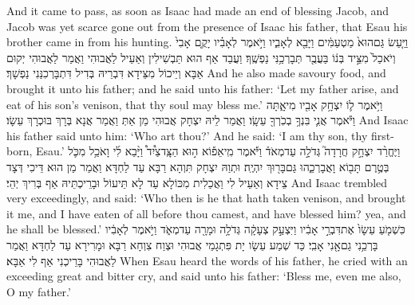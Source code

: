 {And it came to pass, as soon as Isaac had made an end of blessing Jacob, and Jacob was yet scarce gone out from the presence of Isaac his father, that Esau his brother came in from his hunting.}{}
{וַיַּ֤עַשׂ גַּם\maqqaf הוּא֙ מַטְעַמִּ֔ים וַיָּבֵ֖א לְאָבִ֑יו וַיֹּ֣אמֶר לְאָבִ֗יו יָקֻ֤ם אָבִי֙ וְיֹאכַל֙ מִצֵּ֣יד בְּנ֔וֹ בַּעֲבֻ֖ר תְּבָרְכַ֥נִּי נַפְשֶֽׁךָ׃}
{וַעֲבַד אַף הוּא תַּבְשִׁילִין וְאַעֵיל לַאֲבוּהִי וַאֲמַר לַאֲבוּהִי יְקוּם אַבָּא וְיֵיכוֹל מִצֵּידָא דִּבְרֵיהּ בְּדִיל דִּתְבָּרְכִנַּנִי נַפְשָׁךְ׃}
{And he also made savoury food, and brought it unto his father; and he said unto his father: ‘Let my father arise, and eat of his son’s venison, that thy soul may bless me.’}{}
{וַיֹּ֥אמֶר ל֛וֹ יִצְחָ֥ק אָבִ֖יו מִי\maqqaf אָ֑תָּה וַיֹּ֕אמֶר אֲנִ֛י בִּנְךָ֥ בְכֹֽרְךָ֖ עֵשָֽׂו׃}
{וַאֲמַר לֵיהּ יִצְחָק אֲבוּהִי מַן אַתְּ וַאֲמַר אֲנָא בְּרָךְ בּוּכְרָךְ עֵשָׂו׃}
{And Isaac his father said unto him: ‘Who art thou?’ And he said: ‘I am thy son, thy first-born, Esau.’}{}
{וַיֶּחֱרַ֨ד יִצְחָ֣ק חֲרָדָה֮ גְּדֹלָ֣ה עַד\maqqaf מְאֹד֒ וַיֹּ֡אמֶר מִֽי\maqqaf אֵפ֡וֹא ה֣וּא הַצָּֽד\maqqaf צַ֩יִד֩ וַיָּ֨בֵא לִ֜י וָאֹכַ֥ל מִכֹּ֛ל בְּטֶ֥רֶם תָּב֖וֹא וָאֲבָרְכֵ֑הוּ גַּם\maqqaf בָּר֖וּךְ יִהְיֶֽה׃}
{וּתְוַהּ יִצְחָק תִּוְהָא רַבָּא עַד לַחְדָּא וַאֲמַר מַן הוּא דֵּיכִי דְּצָד צֵידָא וְאַעֵיל לִי וַאֲכַלִית מִכּוֹלָא עַד לָא תֵּיעוֹל וּבָרֵיכְתֵּיהּ אַף בְּרִיךְ יְהֵי׃}
{And Isaac trembled very exceedingly, and said: ‘Who then is he that hath taken venison, and brought it me, and I have eaten of all before thou camest, and have blessed him? yea, and he shall be blessed.’}{}
{כִּשְׁמֹ֤עַ עֵשָׂו֙ אֶת\maqqaf דִּבְרֵ֣י אָבִ֔יו וַיִּצְעַ֣ק צְעָקָ֔ה גְּדֹלָ֥ה וּמָרָ֖ה עַד\maqqaf מְאֹ֑ד וַיֹּ֣אמֶר לְאָבִ֔יו בָּרְכֵ֥נִי גַם\maqqaf אָ֖נִי אָבִֽי׃}
{כַּד שְׁמַע עֵשָׂו יָת פִּתְגָמֵי אֲבוּהִי וּצְוַח צִוְחָא רַבָּא וּמָרִירָא עַד לַחְדָּא וַאֲמַר לַאֲבוּהִי בָּרֵיכְנִי אַף לִי אַבָּא׃}
{When Esau heard the words of his father, he cried with an exceeding great and bitter cry, and said unto his father: ‘Bless me, even me also, O my father.’}{}
